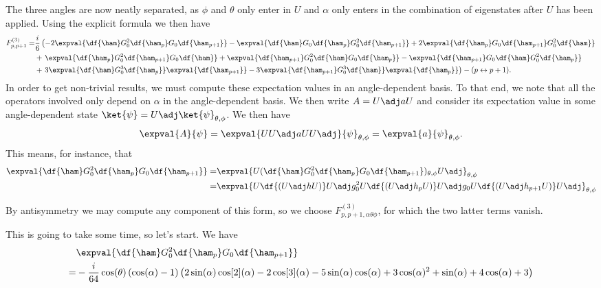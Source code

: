 The three angles are now neatly separated, as $\phi$ and $\theta$ only enter in $U$ and $\alpha$ only enters in the combination of eigenstates after $U$ has been applied. Using the explicit formula we then have
\begin{align*}
	F^{(3)}_{p, p + 1} =& \frac{i}{6}\left(-2\expval{\df{\ham}G_{0}^{2}\df{\ham_{p}}G_{0}\df{\ham_{p + 1}}} - \expval{\df{\ham}G_{0}\df{\ham_{p}}G_{0}^{2}\df{\ham_{p + 1}}} + 2\expval{\df{\ham_{p}}G_{0}\df{\ham_{p + 1}}G_{0}^{2}\df{\ham}} \right. \\
	&+ \left. \expval{\df{\ham_{p}}G_{0}^{2}\df{\ham_{p + 1}}G_{0}\df{\ham}} + \expval{\df{\ham_{p + 1}}G_{0}^{2}\df{\ham}G_{0}\df{\ham_{p}}} - \expval{\df{\ham_{p + 1}}G_{0}\df{\ham}G_{0}^{2}\df{\ham_{p}}} \right. \\
	&+ \left. 3\expval{\df{\ham}G_{0}^{3}\df{\ham_{p}}}\expval{\df{\ham_{p + 1}}} - 3\expval{\df{\ham_{p + 1}}G_{0}^{3}\df{\ham}}\expval{\df{\ham_{p}}}\right) - (p \leftrightarrow p + 1).
\end{align*}
In order to get non-trivial results, we must compute these expectation values in an angle-dependent basis. To that end, we note that all the operators involved only depend on $\alpha$ in the angle-dependent basis. We then write $A = U\adj aU$ and consider its expectation value in some angle-dependent state $\ket{\psi} = U\adj\ket{\psi}_{\theta, \phi}$. We then have
\begin{align*}
	\expval{A}{\psi} = \expval{UU\adj aUU\adj}{\psi}_{\theta, \phi} = \expval{a}{\psi}_{\theta, \phi}.
\end{align*}
This means, for instance, that
\begin{align*}
	\expval{\df{\ham}G_{0}^{2}\df{\ham_{p}}G_{0}\df{\ham_{p + 1}}} =& \expval{U(\df{\ham}G_{0}^{2}\df{\ham_{p}}G_{0}\df{\ham_{p + 1}})_{\theta, \phi}U\adj}_{\theta, \phi} \\
	=& \expval{U\df{(U\adj hU)}U\adj g_{0}^{2}U\df{(U\adj h_{p}U)}U\adj g_{0}U\df{(U\adj h_{p + 1}U)}U\adj}_{\theta, \phi}
\end{align*}

By antisymmetry we may compute any component of this form, so we choose $F^{(3)}_{p, p + 1, \alpha\theta\phi}$, for which the two latter terms vanish.

This is going to take some time, so let's start. We have
\begin{align*}
	 &\expval{\df{\ham}G_{0}^{2}\df{\ham_{p}}G_{0}\df{\ham_{p + 1}}} \\
	=& -\frac{i}{64}\cos(\theta)\left(\cos(\alpha)-1\right) \left(2 \sin(\alpha)\cos[2](\alpha) - 2\cos[3](\alpha) - 5 \sin(\alpha)\cos(\alpha) + 3\cos(\alpha)^{2} + \sin(\alpha) + 4\cos(\alpha) + 3\right)
\end{align*}

